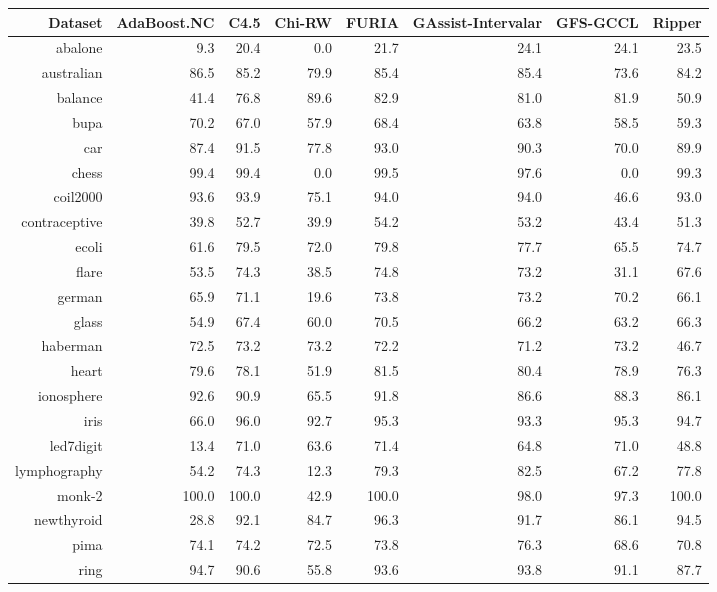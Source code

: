 \documentclass[a4paper,11pt]{article}
\begin{document}
\begin{table}[!htp]
\centering\scriptsize
\begin{tabular}{
|r|r|r|r|r|r|r|r|}
\hline
 
Dataset & AdaBoost.NC & C4.5 & Chi-RW & FURIA & GAssist-Intervalar & GFS-GCCL & Ripper\\
\hline
abalone & 9.3 & 20.4 & 0.0 & 21.7 & 24.1 & 24.1 & 23.5\\
\hline
australian & 86.5 & 85.2 & 79.9 & 85.4 & 85.4 & 73.6 & 84.2\\
\hline
balance & 41.4 & 76.8 & 89.6 & 82.9 & 81.0 & 81.9 & 50.9\\
\hline
bupa & 70.2 & 67.0 & 57.9 & 68.4 & 63.8 & 58.5 & 59.3\\
\hline
car & 87.4 & 91.5 & 77.8 & 93.0 & 90.3 & 70.0 & 89.9\\
\hline
chess & 99.4 & 99.4 & 0.0 & 99.5 & 97.6 & 0.0 & 99.3\\
\hline
coil2000 & 93.6 & 93.9 & 75.1 & 94.0 & 94.0 & 46.6 & 93.0\\
\hline
contraceptive & 39.8 & 52.7 & 39.9 & 54.2 & 53.2 & 43.4 & 51.3\\
\hline
ecoli & 61.6 & 79.5 & 72.0 & 79.8 & 77.7 & 65.5 & 74.7\\
\hline
flare & 53.5 & 74.3 & 38.5 & 74.8 & 73.2 & 31.1 & 67.6\\
\hline
german & 65.9 & 71.1 & 19.6 & 73.8 & 73.2 & 70.2 & 66.1\\
\hline
glass & 54.9 & 67.4 & 60.0 & 70.5 & 66.2 & 63.2 & 66.3\\
\hline
haberman & 72.5 & 73.2 & 73.2 & 72.2 & 71.2 & 73.2 & 46.7\\
\hline
heart & 79.6 & 78.1 & 51.9 & 81.5 & 80.4 & 78.9 & 76.3\\
\hline
ionosphere & 92.6 & 90.9 & 65.5 & 91.8 & 86.6 & 88.3 & 86.1\\
\hline
iris & 66.0 & 96.0 & 92.7 & 95.3 & 93.3 & 95.3 & 94.7\\
\hline
led7digit & 13.4 & 71.0 & 63.6 & 71.4 & 64.8 & 71.0 & 48.8\\
\hline
lymphography & 54.2 & 74.3 & 12.3 & 79.3 & 82.5 & 67.2 & 77.8\\
\hline
monk-2 & 100.0 & 100.0 & 42.9 & 100.0 & 98.0 & 97.3 & 100.0\\
\hline
newthyroid & 28.8 & 92.1 & 84.7 & 96.3 & 91.7 & 86.1 & 94.5\\
\hline
pima & 74.1 & 74.2 & 72.5 & 73.8 & 76.3 & 68.6 & 70.8\\
\hline
ring & 94.7 & 90.6 & 55.8 & 93.6 & 93.8 & 91.1 & 87.7\\

\end{tabular}
\end{table}
\end{document}
